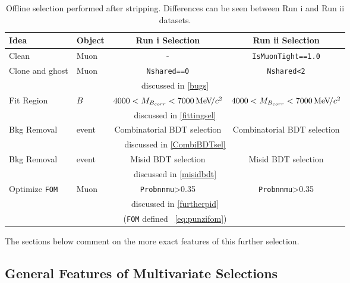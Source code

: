 \begin{table}[h!]
\small
\begin{center}
\begin{tabular}{l l c c}

      Idea & Object & Run \Rn{1} Selection & Run \Rn{2} Selection \\ \hline
      Clean & Muon & - & \texttt{IsMuonTight==1.0}\\
      Clone and ghost & Muon & \texttt{Nshared==0} & \texttt{Nshared<2} \\
      \multicolumn{4}{c}{discussed in \autoref{bugs}} \\
      Fit Region & $B$ & $4000 <M_{B_{corr}}<7000{\mathrm{\,Me\kern -0.1em V\!/}c^2}$ & $4000<M_{B_{corr}}<7000{\mathrm{\,Me\kern -0.1em V\!/}c^2}$ \\
      \multicolumn{4}{c}{discussed in \autoref{fittingsel}} \\
      Bkg Removal & event & Combinatorial BDT selection & Combinatorial BDT selection \\    
      \multicolumn{4}{c}{discussed in \autoref{CombiBDTsel}} \\
      Bkg Removal & event & Misid BDT selection & Misid BDT selection \\
      \multicolumn{4}{c}{discussed in \autoref{misidbdt}} \\
	Optimize \texttt{FOM} & Muon & \texttt{Probnnmu}>0.35 & \texttt{Probnnmu}>0.35 \\
      \multicolumn{4}{c}{discussed in \autoref{furtherpid}} \\
	\multicolumn{4}{c}{(\texttt{FOM}  defined ~\autoref{eq:punzifom})} \\
      \hline
      \end{tabular}
\end{center}
\caption{Offline selection performed after stripping. Differences can be seen between Run \Rn{1} and Run \Rn{2} datasets.}
\label{tab:OfflineSelection}
\end{table}

The sections below comment on the more exact features of this further selection. 

	\subsection{General Features of Multivariate Selections}

